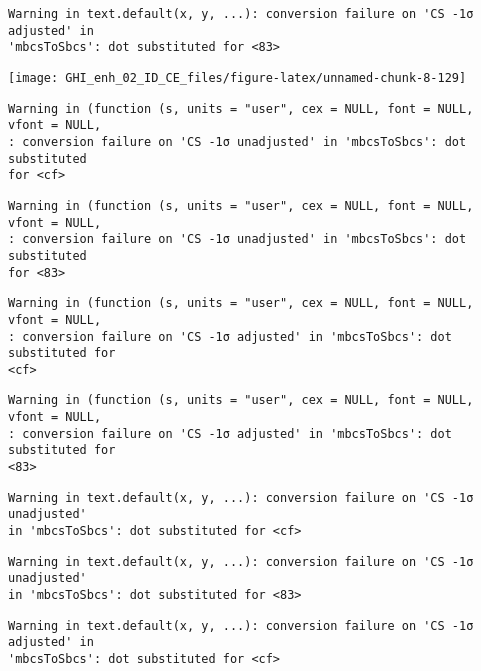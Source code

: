 \documentclass[
  10pt,
  a4paper,oneside]{article}
\begin{document}
\begin{verbatim}
Warning in text.default(x, y, ...): conversion failure on 'CS -1σ adjusted' in
'mbcsToSbcs': dot substituted for <83>
\end{verbatim}

\begin{center}\texttt{[image: GHI\_enh\_02\_ID\_CE\_files/figure-latex/unnamed-chunk-8-129]} \end{center}

\begin{verbatim}
Warning in (function (s, units = "user", cex = NULL, font = NULL, vfont = NULL,
: conversion failure on 'CS -1σ unadjusted' in 'mbcsToSbcs': dot substituted
for <cf>
\end{verbatim}

\begin{verbatim}
Warning in (function (s, units = "user", cex = NULL, font = NULL, vfont = NULL,
: conversion failure on 'CS -1σ unadjusted' in 'mbcsToSbcs': dot substituted
for <83>
\end{verbatim}

\begin{verbatim}
Warning in (function (s, units = "user", cex = NULL, font = NULL, vfont = NULL,
: conversion failure on 'CS -1σ adjusted' in 'mbcsToSbcs': dot substituted for
<cf>
\end{verbatim}

\begin{verbatim}
Warning in (function (s, units = "user", cex = NULL, font = NULL, vfont = NULL,
: conversion failure on 'CS -1σ adjusted' in 'mbcsToSbcs': dot substituted for
<83>
\end{verbatim}

\begin{verbatim}
Warning in text.default(x, y, ...): conversion failure on 'CS -1σ unadjusted'
in 'mbcsToSbcs': dot substituted for <cf>
\end{verbatim}

\begin{verbatim}
Warning in text.default(x, y, ...): conversion failure on 'CS -1σ unadjusted'
in 'mbcsToSbcs': dot substituted for <83>
\end{verbatim}

\begin{verbatim}
Warning in text.default(x, y, ...): conversion failure on 'CS -1σ adjusted' in
'mbcsToSbcs': dot substituted for <cf>
\end{verbatim}
\end{document}
